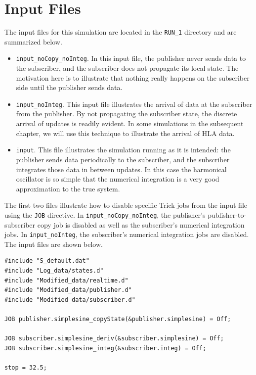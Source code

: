 \section{Input Files}

The input files for this simulation are located in the {\tt RUN\_1} directory
and are summarized below.

\begin{itemize}
\item{
  {\tt input\_noCopy\_noInteg}.
  In this input file,
  the publisher never sends data to the subscriber, and
  the subscriber does not propagate its local state.
  The motivation here is to illustrate that nothing really happens
  on the subscriber side until the publisher sends data.
}
\item{
  {\tt input\_noInteg}.
  This input file illustrates the arrival of data at the subscriber from
  the publisher.
  By not propagating the subscriber state, the discrete arrival of
  updates is readily evident.
  In some simulations in the subsequent chapter,
  we will use this technique to illustrate the arrival of HLA data.
}
\item{
  {\tt input}.
  This file illustrates the simulation running as it is intended:
  the publisher sends data periodically to the subscriber,
  and the subscriber integrates those data in between updates.
  In this case the harmonical oscillator is so simple that the numerical
  integration is a very good approximation to the true system.
}
\end{itemize}

The first two files illustrate how to disable specific Trick jobs from
the input file using the {\tt JOB} directive.
In {\tt input\_noCopy\_noInteg}, the publisher's
publisher-to-subscriber copy job is disabled
as well as the subscriber's numerical integration jobs.
In {\tt input\_noInteg}, the subscriber's numerical integration jobs are
disabled.
The input files are shown below.


\begin{lstlisting}[caption={{\tt SIM\_simplesine\_pubsub} input file, {\tt input\_noCopy\_noInteg}},label={list:SIM-pubsub-input-noCopy-noInteg}]
#include "S_default.dat"
#include "Log_data/states.d"
#include "Modified_data/realtime.d"
#include "Modified_data/publisher.d"
#include "Modified_data/subscriber.d"

JOB publisher.simplesine_copyState(&publisher.simplesine) = Off;

JOB subscriber.simplesine_deriv(&subscriber.simplesine) = Off;
JOB subscriber.simplesine_integ(&subscriber.integ) = Off;

stop = 32.5;
\end{lstlisting}

